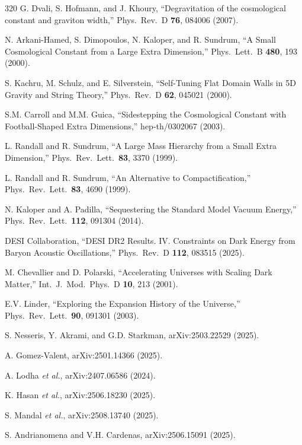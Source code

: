 \begin{thebibliography}{320}
G. Dvali, S. Hofmann, and J. Khoury,
``Degravitation of the cosmological constant and graviton width,''
Phys.\ Rev.\ D \textbf{76}, 084006 (2007).

N. Arkani-Hamed, S. Dimopoulos, N. Kaloper, and R. Sundrum,
``A Small Cosmological Constant from a Large Extra Dimension,''
Phys.\ Lett.\ B \textbf{480}, 193 (2000).

S. Kachru, M. Schulz, and E. Silverstein,
``Self-Tuning Flat Domain Walls in 5D Gravity and String Theory,''
Phys.\ Rev.\ D \textbf{62}, 045021 (2000).

S.M. Carroll and M.M. Guica,
``Sidestepping the Cosmological Constant with Football-Shaped Extra Dimensions,''
hep-th/0302067 (2003).

L. Randall and R. Sundrum,
``A Large Mass Hierarchy from a Small Extra Dimension,''
Phys.\ Rev.\ Lett.\ \textbf{83}, 3370 (1999).

L. Randall and R. Sundrum,
``An Alternative to Compactification,''
Phys.\ Rev.\ Lett.\ \textbf{83}, 4690 (1999).

N. Kaloper and A. Padilla,
``Sequestering the Standard Model Vacuum Energy,''
Phys.\ Rev.\ Lett.\ \textbf{112}, 091304 (2014).

DESI Collaboration,
``DESI DR2 Results. IV. Constraints on Dark Energy from Baryon Acoustic Oscillations,''
Phys.\ Rev.\ D \textbf{112}, 083515 (2025).

M. Chevallier and D. Polarski,
``Accelerating Universes with Scaling Dark Matter,''
Int.\ J.\ Mod.\ Phys.\ D \textbf{10}, 213 (2001).

E.V. Linder,
``Exploring the Expansion History of the Universe,''
Phys.\ Rev.\ Lett.\ \textbf{90}, 091301 (2003).

S. Nesseris, Y. Akrami, and G.D. Starkman,
arXiv:2503.22529 (2025).

A. Gomez-Valent,
arXiv:2501.14366 (2025).

A. Lodha \textit{et al.},
arXiv:2407.06586 (2024).

K. Hasan \textit{et al.},
arXiv:2506.18230 (2025).

S. Mandal \textit{et al.},
arXiv:2508.13740 (2025).

S. Andrianomena and V.H. Cardenas,
arXiv:2506.15091 (2025).


\end{thebibliography}

